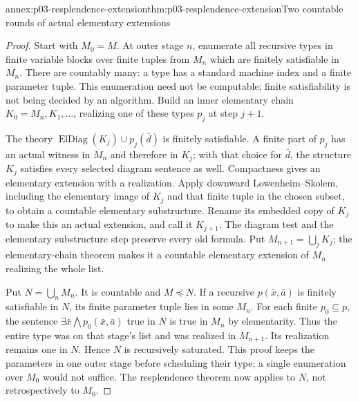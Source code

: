 \begin{annexitem}{annex:p03-resplendence-extension}{thm:p03-resplendence-extension}{Two countable rounds of actual elementary extensions}
\begin{proof}
Start with \(M_0=M\). At outer stage \(n\), enumerate all recursive
types in finite variable blocks over finite tuples from \(M_n\) which
are finitely satisfiable in \(M_n\). There are countably many: a type
has a standard machine index and a finite parameter tuple. This enumeration
need not be computable; finite satisfiability is not being decided by an
algorithm. Build an inner elementary chain \(K_0=M_n,K_1,\ldots\),
realizing one of these types \(p_j\) at step \(j+1\).

The theory \(\operatorname{ElDiag}(K_j)\cup p_j(\bar d)\) is finitely
satisfiable. A finite part of \(p_j\) has an actual witness in \(M_n\)
and therefore in \(K_j\); with that choice for \(\bar d\), the
structure \(K_j\) satisfies every selected diagram sentence as well.
Compactness gives an elementary extension with a realization. Apply
downward Lowenheim--Skolem, including the elementary image of \(K_j\)
and that finite tuple in the chosen subset, to obtain a countable elementary
substructure. Rename its embedded copy of \(K_j\) to make this an actual
extension, and call it \(K_{j+1}\). The diagram test and the elementary
substructure step preserve every old formula. Put
\(M_{n+1}=\bigcup_jK_j\); the elementary-chain theorem makes it a
countable elementary extension of \(M_n\) realizing the whole list.

Put \(N=\bigcup_nM_n\). It is countable and \(M\preccurlyeq N\).
If a recursive \(p(\bar x,\bar a)\) is finitely satisfiable in \(N\),
its finite parameter tuple lies in some \(M_n\). For each finite
\(p_0\subseteq p\), the sentence
\(\exists\bar x\bigwedge p_0(\bar x,\bar a)\) true in \(N\)
is true in \(M_n\) by elementarity. Thus the entire type was on that
stage's list and was realized in \(M_{n+1}\). Its realization remains
one in \(N\). Hence \(N\) is recursively saturated. This proof keeps
the parameters in one outer stage before scheduling their type; a single
enumeration over \(M_0\) would not suffice. The resplendence theorem
now applies to \(N\), not retrospectively to \(M_0\).
\end{proof}
\end{annexitem}

